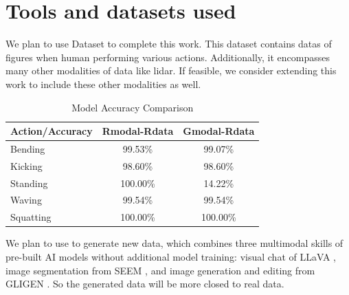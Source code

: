 \documentclass[a4paper,11pt]{scrartcl}
\begin{document}
\section{Tools and datasets used}
We plan to use Dataset \cite{yang2023mm} to complete this work. This dataset contains datas of figures when human performing various actions. Additionally, it encompasses many other modalities of data like lidar.
If feasible, we consider extending this work to include these other modalities as well.
\begin{table}[htbp]
  \centering
  \caption{Model Accuracy Comparison}
  \begin{tabular}{@{} lcc @{}}
  \toprule
  Action/Accuracy & Rmodal-Rdata & Gmodal-Rdata  \\ 
  \midrule
  Bending   & 99.53\% & 99.07\% \\
  Kicking   & 98.60\% & 98.60\% \\
  Standing  & 100.00\% & 14.22\% \\
  Waving    & 99.54\% & 99.54\% \\
  Squatting & 100.00\% & 100.00\% \\
  \bottomrule
  \end{tabular}
  \end{table}
We plan to use \cite{chen2023llava} to generate new data, which combines three multimodal skills of pre-built AI models
without additional model training: visual chat of LLaVA , image segmentation
from SEEM , and image generation and editing from GLIGEN . So the generated data will be more closed to real data.



\end{document}
